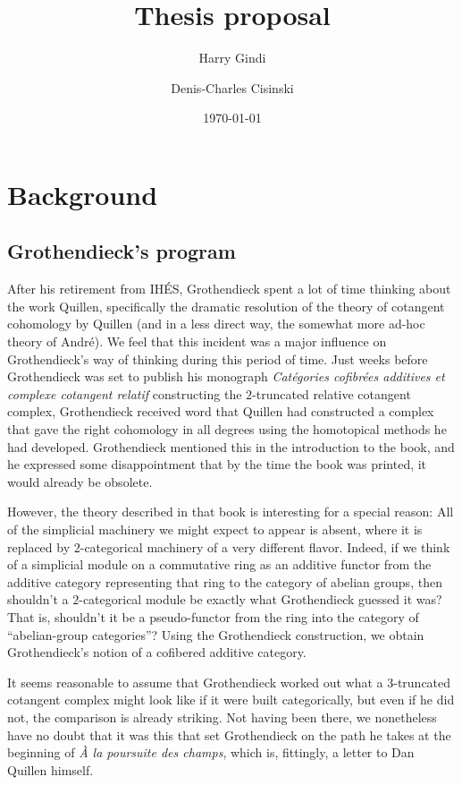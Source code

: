 \documentclass[a4paper,9pt]{amsart}
\theoremstyle{plain}   %
\theoremstyle{remark}
\theoremstyle{plain}
\begin{document}
\title{Thesis proposal}
\author[H. Gindi]{Harry Gindi}
\author[D.-C. Cisinski]{Denis-Charles Cisinski}
\date{\today}

\maketitle

\section{Background}

\subsection{Grothendieck's program}
After his retirement from IH\'ES, Grothendieck spent a lot of time thinking about the work Quillen, specifically the dramatic resolution of the theory of cotangent cohomology by Quillen (and in a less direct way, the somewhat more ad-hoc theory of Andr\'e).  We feel that this incident was a major influence on Grothendieck's way of thinking during this period of time. Just weeks before Grothendieck was set to publish his monograph \emph{Cat\'egories cofibr\'ees additives et complexe cotangent relatif} constructing the \(2\)-truncated relative cotangent complex, Grothendieck received word that Quillen had constructed a complex that gave the right cohomology in all degrees using the homotopical methods he had developed.  Grothendieck mentioned this in the introduction to the book, and he expressed some disappointment that by the time the book was printed, it would already be obsolete.  

However, the theory described in that book is interesting for a special reason: All of the simplicial machinery we might expect to appear is absent, where it is replaced by \(2\)-categorical machinery of a very different flavor.  Indeed, if we think of a simplicial module on a commutative ring as an additive functor from the additive category representing that ring to the category of abelian groups, then shouldn't a \(2\)-categorical module be exactly what Grothendieck guessed it was? That is, shouldn't it be a pseudo-functor from the ring into the category of ``abelian-group categories''?  Using the Grothendieck construction, we obtain Grothendieck's notion of a cofibered additive category.  

It seems reasonable to assume that Grothendieck worked out what a \(3\)-truncated cotangent complex might look like if it were built categorically, but even if he did not, the comparison is already striking.  Not having been there, we nonetheless have no doubt that it was this that set Grothendieck on the path he takes at the beginning of \emph{\`A la poursuite des champs}, which is, fittingly, a letter to Dan Quillen himself.  
\end{document}

